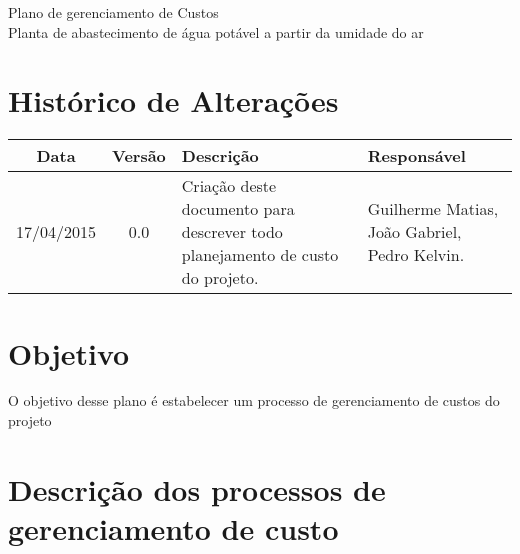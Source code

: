 

% 


\begin{center}
 {\large Plano de gerenciamento de Custos}\\[0.2cm]
 {Planta de abastecimento de água potável a partir da umidade do ar}\\
 \end{center}
 
 \section*{Histórico de Alterações}
\begin{table}[h]
\centering
\begin{tabular}{|c|c|p{6cm}|p{5cm}|}

Data & Versão & Descrição & Responsável\\
\hline                               
17/04/2015 & 0.0 & Criação deste documento para descrever todo planejamento de custo do projeto. & Guilherme Matias, João Gabriel, Pedro Kelvin.\\ \hline
\end{tabular}
\end{table}

\section*{Objetivo}

O objetivo desse plano é estabelecer um processo de gerenciamento de custos do projeto
  
\section*{Descrição dos processos de gerenciamento de custo}

